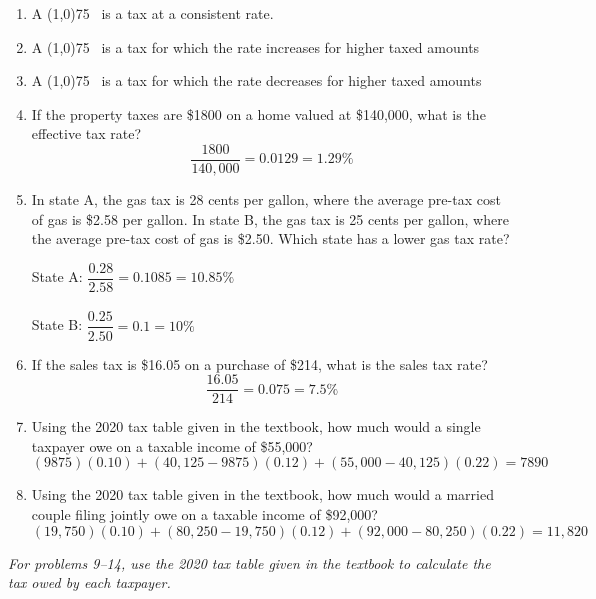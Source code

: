 \begin{enumerate}
\item A \line(1,0){75} \ is a tax at a consistent rate. 

\item A \line(1,0){75} \ is a tax for which the rate increases for higher taxed amounts 

\item A \line(1,0){75} \ is a tax for which the rate decreases for higher taxed amounts 

\item If the property taxes are \$1800 on a home valued at \$140,000, what is the effective tax rate? 
\[\dfrac{1800}{140,000} = 0.0129 = 1.29\%\]

\item In state A, the gas tax is 28 cents per gallon, where the average pre-tax cost of gas is \$2.58 per gallon.  In state B, the gas tax is 25 cents per gallon, where the average pre-tax cost of gas is \$2.50.  Which state has a lower gas tax rate? 
\begin{center}
State A: $\dfrac{0.28}{2.58} = 0.1085 = 10.85\%$\\ \text{}\\
State B: $\dfrac{0.25}{2.50} = 0.1 = 10\%$
\end{center}

\item If the sales tax is \$16.05 on a purchase of \$214, what is the sales tax rate? 
\[\dfrac{16.05}{214} = 0.075 = 7.5\%\]

\item Using the 2020 tax table given in the textbook, how much would a single taxpayer owe on a taxable income of \$55,000? 
\[(9875)(0.10) + (40,125-9875)(0.12) + (55,000-40,125)(0.22) = 7890\]

\item Using the 2020 tax table given in the textbook, how much would a married couple filing jointly owe on a taxable income of \$92,000? 
\[(19,750)(0.10) + (80,250-19,750)(0.12) + (92,000-80,250)(0.22) = 11,820\]
\end{enumerate}
\pagebreak

\emph{For problems 9--14, use the 2020 tax table given in the textbook to calculate the tax owed by each taxpayer.}

